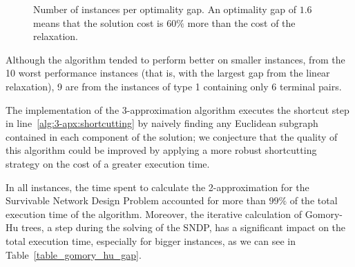 
\begin{figure}[t!]
\centering
{}
\caption{Number of instances per optimality gap. An optimality gap of \(1.6\) means that the solution cost is \(60\%\) more than the cost of the relaxation.}
\label{fig:hist_opt_gap}
\end{figure}

Although the algorithm tended to perform better on smaller instances, from the 10 worst performance instances (that is, with the largest gap from the linear relaxation), 9 are from the instances of type 1 containing only 6 terminal pairs.

The implementation of the 3-approximation algorithm executes the shortcut step in line~\eqref{alg:3-apx:shortcutting} by naively finding any Euclidean subgraph contained in each component of the solution; we conjecture that the quality of this algorithm could be improved by applying a more robust shortcutting strategy on the cost of a greater execution time.

In all instances, the time spent to calculate the 2-approximation for the Survivable Network Design Problem accounted for more than \(99\%\) of the total execution time of the algorithm. Moreover, the iterative calculation of Gomory-Hu trees, a step during the solving of the SNDP, has a significant impact on the total execution time, especially for bigger instances, as we can see in Table~\ref{table_gomory_hu_gap}.

